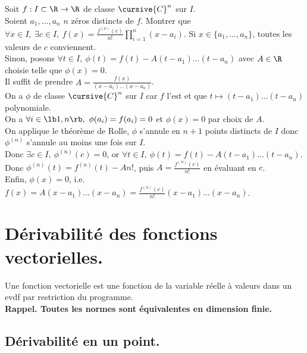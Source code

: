 \documentclass[11pt]{article}
\begin{document}
\begin{exercice}{}{}
    Soit $f:I\subset\R\to\R$ de classe $\cursive{C}^n$ sur $I$.\\
    Soient $a_1,...,a_n$ $n$ zéros distincts de $f$. Montrer que $\forall x \in I, ~ \exists c \in I, ~ f(x)=\frac{f^{(n)}(c)}{n!}\prod_{i=1}^n(x-a_i)$.
    \tcblower
    Si $x\in\{a_1,...,a_n\}$, toutes les valeurs de $c$ conviennent.\\
    Sinon, posons $\forall t \in I, ~ \phi(t)=f(t)-A(t-a_1)...(t-a_n)$ avec $A\in\R$ choisie telle que $\phi(x)=0$.\\
    Il suffit de prendre $A=\frac{f(x)}{(x-a_1)...(x-a_n)}$.\\
    On a $\phi$ de classe $\cursive{C}^n$ sur $I$ car $f$ l'est et que $t\mapsto(t-a_1)...(t-a_n)$ polynomiale.\\
    On a $\forall i \in \lb1,n\rb, ~ \phi(a_i)=f(a_i)=0$ et $\phi(x)=0$ par choix de $A$.\\
    On applique le théorème de Rolle, $\phi$ s'annule en $n+1$ points distincts de $I$ donc $\phi^{(n)}$ s'annule au moins une fois sur $I$.\\
    Donc $\exists c \in I, ~ \phi^{(n)}(c)=0$, or $\forall t \in I, ~ \phi(t)=f(t)-A(t-a_1)...(t-a_n)$.\\
    Donc $\phi^{(n)}(t)=f^{(n)}(t)-An!$, puis $A=\frac{f^{(n)}(c)}{n!}$ en évaluant en $c$.\\
    Enfin, $\phi(x)=0$, i.e. $f(x)=A(x-a_1)...(x-a_n)=\frac{f^{(n)}(c)}{n!}(x-a_1)...(x-a_n)$.
\end{exercice}

\vspace*{-0.7cm}

\section{Dérivabilité des fonctions vectorielles.}

\begin{defi}{}{}
    Une fonction vectorielle est une fonction de la variable réelle à valeurs dans un evdf par restriction du programme.\\
    \bf{Rappel.} Toutes les normes sont équivalentes en dimension finie.
\end{defi}

\vspace*{-0.7cm}

\subsection{Dérivabilité en un point.}
\end{document}
